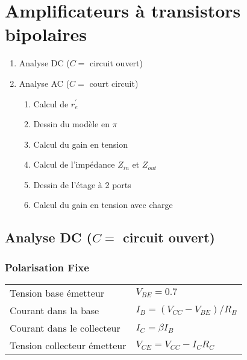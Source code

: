 
\section{Amplificateurs à transistors bipolaires}
\begin{enumerate}
    \item Analyse DC ($C=$ circuit ouvert)
    \item Analyse AC ($C=$ court circuit)
        \begin{enumerate}
            \item Calcul de $r^{\prime}_e$
            \item Dessin du modèle en $\pi$
            \item Calcul du gain en tension
            \item Calcul de l'impédance $Z_{in}$ et $Z_{out}$
            \item Dessin de l'étage à 2 ports
            \item Calcul du gain en tension avec charge
        \end{enumerate}
\end{enumerate}
\subsection{Analyse DC ($C=$ circuit ouvert)}
\subsubsection{Polarisation Fixe}
\begin{center}
    
\end{center}
\begin{tabular}{ll}
    Tension base émetteur & \(V_{BE}=0.7\) \\
    Courant dans la base & \(I_B=(V_{CC}-V_{BE})/R_{B}\)\\
    Courant dans le collecteur & \(I_C=\beta I_B\)\\
    Tension collecteur émetteur & \(V_{CE}=V_{CC}-I_C R_C\)
\end{tabular}

